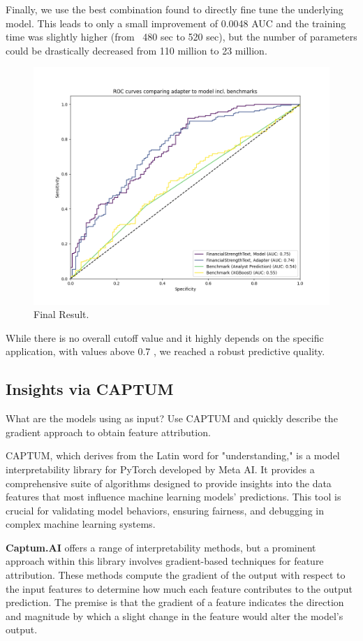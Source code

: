 \documentclass[conference]{IEEEtran}
\begin{document}
Finally, we use the best combination found to directly fine tune the underlying model. This leads to only a small improvement of 0.0048 AUC and the training time was slightly higher (from ~480 sec to 520 sec), but the number of parameters could be drastically decreased from 110 million to 23 million.

\begin{figure}[H]
    \centering
    \includegraphics[width=.85\linewidth]{../3. evaluation/roc_curves/Fourth Experiment.png}
    \caption[Fourth Experiment]{Final Result.}
    \label{fig:Fourthexp}
\end{figure}

While there is no overall cutoff value and it highly depends on the specific application, with values above 0.7 \cite{Hosmer2013}, we reached a robust predictive quality.

\subsection{Insights via CAPTUM}%
What are the models using as input? Use CAPTUM and quickly describe the gradient approach to obtain feature attribution. \cite{Kokhlikyan2020}

CAPTUM, which derives from the Latin word for "understanding," is a model interpretability library for PyTorch developed by Meta AI. It provides a comprehensive suite of algorithms designed to provide insights into the data features that most influence machine learning models' predictions. This tool is crucial for validating model behaviors, ensuring fairness, and debugging in complex machine learning systems.

\textbf{Captum.AI} offers a range of interpretability methods, but a prominent approach within this library involves gradient-based techniques for feature attribution. These methods compute the gradient of the output with respect to the input features to determine how much each feature contributes to the output prediction. The premise is that the gradient of a feature indicates the direction and magnitude by which a slight change in the feature would alter the model's output.
\end{document}
